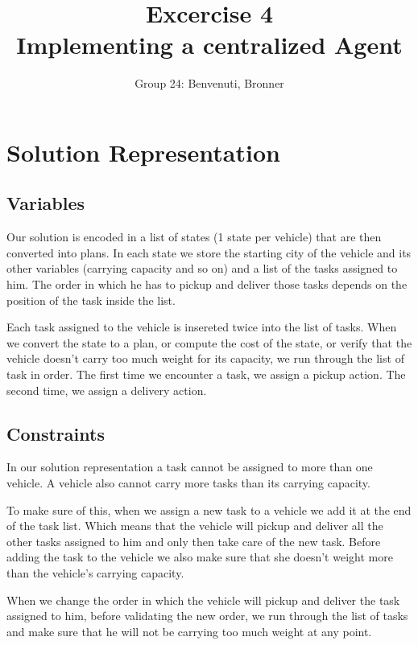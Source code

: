 \documentclass[11pt]{article}
\title{\bf Excercise 4\\ Implementing a centralized Agent}
\author{Group 24: Benvenuti, Bronner}
\begin{document}
\maketitle

\section{Solution Representation}

\subsection{Variables}
Our solution is encoded in a list of states (1 state per vehicle) that are then converted into plans. In each state we store the starting city of the vehicle and its other variables (carrying capacity and so on) and a list of the tasks assigned to him. The order in which he has to pickup and deliver those tasks depends on the position of the task inside the list.

Each task assigned to the vehicle is insereted twice into the list of tasks. When we convert the state to a plan, or compute the cost of the state, or verify that the vehicle doesn't carry too much weight for its capacity, we run through the list of task in order. The first time we encounter a task, we assign a pickup action. The second time, we assign a delivery action. 

\subsection{Constraints}
In our solution representation a task cannot be assigned to more than one vehicle. A vehicle also cannot carry more tasks than its carrying capacity.

To make sure of this, when we assign a new task to a vehicle we add it at the end of the task list. Which means that the vehicle will pickup and deliver all the other tasks assigned to him and only then take care of the new task. Before adding the task to the vehicle we also make sure that she doesn't weight more than the vehicle's carrying capacity.

When we change the order in which the vehicle will pickup and deliver the task assigned to him, before validating the new order, we run through the list of tasks and make sure that he will not be carrying too much weight at any point.
\end{document}
